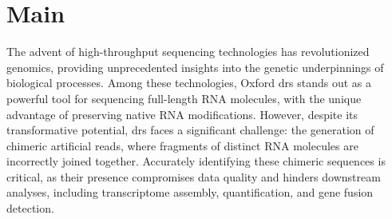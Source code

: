 \documentclass[pdflatex, sn-mathphys-num, lineno]{sn-jnl}%
\theoremstyle{thmstyleone}%
\theoremstyle{thmstyletwo}%
\theoremstyle{thmstylethree}%
\begin{document}
\maketitle
\section{Main}\label{sec1}





The advent of high-throughput sequencing technologies has revolutionized genomics, providing unprecedented insights into the genetic underpinnings of biological processes.
Among these technologies, Oxford \gls{drs} stands out as a powerful tool for sequencing full-length RNA molecules, with the unique advantage of preserving native RNA modifications.
However, despite its transformative potential, \gls{drs} faces a significant challenge: the generation of chimeric artificial reads, where fragments of distinct RNA molecules are incorrectly joined together.
Accurately identifying these chimeric sequences is critical, as their presence compromises data quality and hinders downstream analyses, including transcriptome assembly, quantification, and gene fusion detection.
\end{document}
